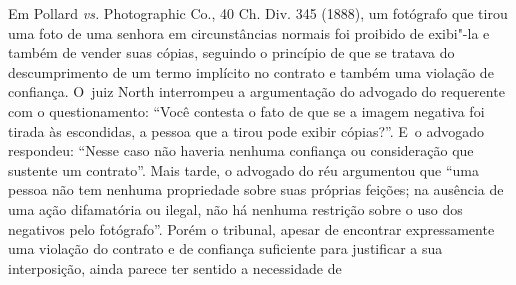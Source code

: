 Em Pollard \emph{vs.} Photographic Co., 40 Ch. Div. 345 (1888), um
fotógrafo que tirou uma foto de uma senhora em circunstâncias normais
foi proibido de exibi"-la e também de vender suas cópias, seguindo o
princípio de que se tratava do descumprimento de um termo implícito no
contrato e também uma violação de confiança. O~juiz North interrompeu a
argumentação do advogado do requerente com o questionamento: ``Você
contesta o fato de que se a imagem negativa foi tirada às escondidas, a
pessoa que a tirou pode exibir cópias?''. E~o advogado respondeu:
``Nesse caso não haveria nenhuma confiança ou consideração que sustente
um contrato''. Mais tarde, o advogado do réu argumentou que ``uma pessoa
não tem nenhuma propriedade sobre suas próprias feições; na ausência de
uma ação difamatória ou ilegal, não há nenhuma restrição sobre o uso dos
negativos pelo fotógrafo''. Porém o tribunal, apesar de encontrar
expressamente uma violação do contrato e de confiança suficiente para
justificar a sua interposição, ainda parece ter sentido a necessidade de
